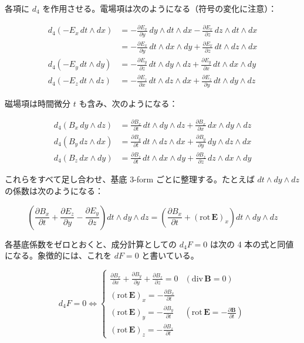 \documentclass[a4paper,12pt,openany]{book}
\begin{document}
各項に \(d_4\)
を作用させる。電場項は次のようになる（符号の変化に注意）：

\[\begin{aligned}
d_4\!\left(-E_x\,dt\wedge dx\right) &= -\frac{\partial E_x}{\partial y}\,dy\wedge dt\wedge dx - \frac{\partial E_x}{\partial z}\,dz\wedge dt\wedge dx \\
&= -\frac{\partial E_x}{\partial y}\,dt\wedge dx\wedge dy + \frac{\partial E_x}{\partial z}\,dt\wedge dz\wedge dx \\
d_4\!\left(-E_y\,dt\wedge dy\right) &= -\frac{\partial E_y}{\partial z}\,dt\wedge dy\wedge dz + \frac{\partial E_y}{\partial x}\,dt\wedge dx\wedge dy \\
d_4\!\left(-E_z\,dt\wedge dz\right) &= -\frac{\partial E_z}{\partial x}\,dt\wedge dz\wedge dx + \frac{\partial E_z}{\partial y}\,dt\wedge dy\wedge dz
\end{aligned}\]

磁場項は時間微分 \(t\) も含み、次のようになる：

\[\begin{aligned}
d_4(B_x\,dy\wedge dz) &= \frac{\partial B_x}{\partial t}\,dt\wedge dy\wedge dz + \frac{\partial B_x}{\partial x}\,dx\wedge dy\wedge dz \\
d_4(B_y\,dz\wedge dx) &= \frac{\partial B_y}{\partial t}\,dt\wedge dz\wedge dx + \frac{\partial B_y}{\partial y}\,dy\wedge dz\wedge dx \\
d_4(B_z\,dx\wedge dy) &= \frac{\partial B_z}{\partial t}\,dt\wedge dx\wedge dy + \frac{\partial B_z}{\partial z}\,dz\wedge dx\wedge dy
\end{aligned}\]

これらをすべて足し合わせ、基底 \(3\)-form ごとに整理する。たとえば
\(dt\wedge dy\wedge dz\) の係数は次のようになる：

\[
\left(\frac{\partial B_x}{\partial t} + \frac{\partial E_z}{\partial y} - \frac{\partial E_y}{\partial z}\right) dt\wedge dy\wedge dz = \left(\frac{\partial B_x}{\partial t} + (\mathrm{rot}\,\mathbf{E})_x\right) dt\wedge dy\wedge dz
\]

各基底係数をゼロとおくと、成分計算としての \(d_4F=0\) は次の 4
本の式と同値になる。象徴的には、これを \(dF=0\) と書いている。

\[d_4F = 0 \Longleftrightarrow \begin{cases}
\displaystyle \frac{\partial B_x}{\partial x} + \frac{\partial B_y}{\partial y} + \frac{\partial B_z}{\partial z} = 0 & (\mathrm{div}\,\mathbf{B} = 0) \\[1em]
\displaystyle (\mathrm{rot}\,\mathbf{E})_x = -\frac{\partial B_x}{\partial t} & \\[0.5em]
\displaystyle (\mathrm{rot}\,\mathbf{E})_y = -\frac{\partial B_y}{\partial t} & (\mathrm{rot}\,\mathbf{E} = -\frac{\partial\mathbf{B}}{\partial t}) \\[0.5em]
\displaystyle (\mathrm{rot}\,\mathbf{E})_z = -\frac{\partial B_z}{\partial t} & 
\end{cases}\]
\end{document}
